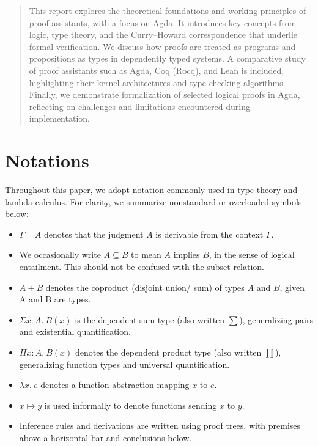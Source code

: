 \documentclass[12pt]{article}
\begin{document}
\begin{abstract}
This report explores the theoretical foundations and working principles of proof assistants, with a focus on Agda. It introduces key concepts from logic, type theory, and the Curry–Howard correspondence that underlie formal verification. We discuss how proofs are treated as programs and propositions as types in dependently typed systems. A comparative study of proof assistants such as Agda, Coq (Rocq), and Lean is included, highlighting their kernel architectures and type-checking algorithms. Finally, we demonstrate formalization of selected logical proofs in Agda, reflecting on challenges and limitations encountered during implementation.
\end{abstract}
\clearpage



{\small
\tableofcontents
}
\newpage
\section*{Notations}



Throughout this paper, we adopt notation commonly used in type theory and lambda calculus. For clarity, we summarize nonstandard or overloaded symbols below:

\begin{itemize}

  \item $\Gamma \vdash A$ denotes that the judgment $A$ is derivable from the context $\Gamma$. 
  \item We occasionally write $A \subseteq B$ to mean $A$ implies $B$, in the sense of logical entailment. This should not be confused with the subset relation.
  \item $A + B$ denotes the coproduct (disjoint union/ sum) of types $A$ and $B$, given A and B are types.
  \item $\Sigma x : A.\ B(x)$ is the dependent sum type (also written $\sum$), generalizing pairs and existential quantification.
  \item $\Pi x : A.\ B(x)$ denotes the dependent product type (also written $\prod$), generalizing function types and universal quantification.
  \item $\lambda x.\ e$ denotes a function abstraction mapping $x$ to $e$.
  \item $x \mapsto y$ is used informally to denote functions sending $x$ to $y$.
  \item Inference rules and derivations are written using proof trees, with premises above a horizontal bar and conclusions below.
\end{itemize}
\newpage
\end{document}
